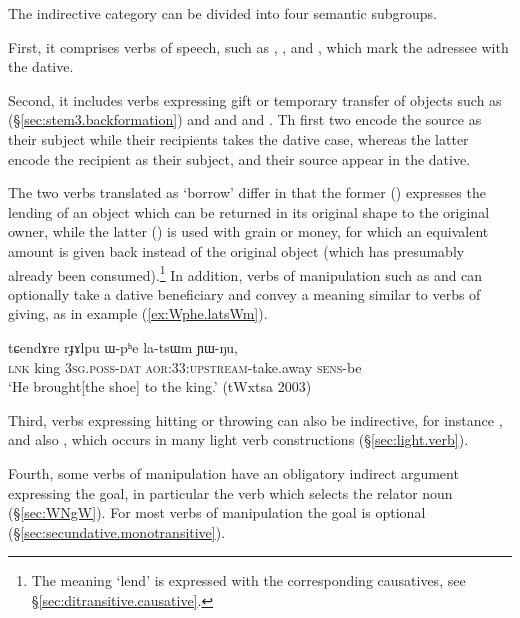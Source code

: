 The indirective category can be divided into four semantic subgroups. 

First, it comprises verbs of speech, such as , ,   and , which mark the adressee with the dative.

Second, it includes verbs expressing gift or temporary transfer of objects such as  (§\ref{sec:stem3.backformation}) and  and   and . Th first two encode the source as their subject while their recipients takes the dative case, whereas the latter encode the recipient as their subject, and their source appear in the dative. 

The two verbs translated as `borrow' differ in that the former () expresses the lending of an object which can be returned in its original shape to the original owner, while the latter () is used with grain or money, for which an equivalent amount is given back instead of the original object (which has presumably already been consumed).\footnote{The meaning `lend' is expressed with the corresponding causatives, see §\ref{sec:ditransitive.causative}.} In addition, verbs of manipulation such as  and  can optionally take a dative beneficiary and convey a meaning similar to verbs of giving, as in example (\ref{ex:Wphe.latsWm}).

\begin{exe}
	\ex \label{ex:Wphe.latsWm}
	\gll  tɕendɤre rɟɤlpu ɯ-pʰe la-tsɯm ɲɯ-ŋu,  \\
	\textsc{lnk}  king \textsc{3sg}.\textsc{poss}-\textsc{dat} \textsc{aor}:3\fl{}3:\textsc{upstream}-take.away \textsc{sens}-be \\
	\glt `He brought[the shoe] to the king.'  (tWxtsa 2003)
\end{exe}

Third, verbs expressing hitting or throwing can also be indirective, for instance , and also , which occurs in many light verb constructions (§\ref{sec:light.verb}).

Fourth, some verbs of manipulation have an obligatory indirect argument expressing the goal, in particular the verb  which selects the relator noun  (§\ref{sec:WNgW}). For most verbs of manipulation the goal is optional  (§\ref{sec:secundative.monotransitive}).

